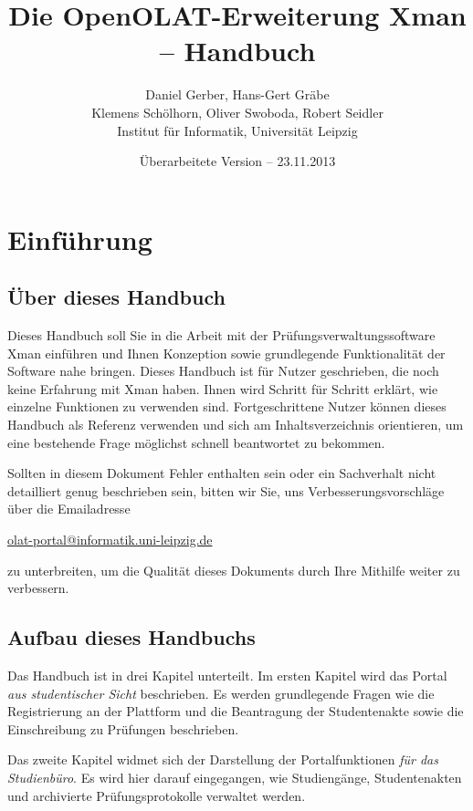 \documentclass[a4paper,11pt]{article}
\author{Daniel Gerber, Hans-Gert Gräbe\\ 
Klemens Schölhorn, Oliver Swoboda, Robert Seidler\\
Institut für Informatik, Universität Leipzig}
\title{Die OpenOLAT-Erweiterung Xman -- Handbuch}
\date{Überarbeitete Version -- 23.11.2013}
\begin{document}
\maketitle

\vspace{3em}

\tableofcontents

\clearpage
\section*{Einführung}

\subsection*{Über dieses Handbuch}

Dieses Handbuch soll Sie in die Arbeit mit der Prüfungsverwaltungssoftware
Xman einführen und Ihnen Konzeption sowie grundlegende Funktionalität der
Software nahe bringen. Dieses Handbuch ist für Nutzer geschrieben, die noch
keine Erfahrung mit Xman haben. Ihnen wird Schritt für Schritt erklärt, wie
einzelne Funktionen zu verwenden sind.  Fortgeschrittene Nutzer können dieses
Handbuch als Referenz verwenden und sich am Inhaltsverzeichnis orientieren, um
eine bestehende Frage möglichst schnell beantwortet zu bekommen.

Sollten in diesem Dokument Fehler enthalten sein oder ein Sachverhalt nicht
detailliert genug beschrieben sein, bitten wir Sie, uns
Verbesserungsvorschläge über die Emailadresse
\begin{center}
  \url{olat-portal@informatik.uni-leipzig.de} 
\end{center}
zu unterbreiten, um die Qualität dieses Dokuments durch Ihre Mithilfe weiter
zu verbessern.

\subsection*{Aufbau dieses Handbuchs}

Das Handbuch ist in drei Kapitel unterteilt. Im ersten Kapitel wird das Portal
{\em aus studentischer Sicht} beschrieben. Es werden
grundlegende Fragen wie die Registrierung an der Plattform und die Beantragung der
Studentenakte sowie die Einschreibung zu Prüfungen beschrieben.

Das zweite Kapitel widmet sich der Darstellung der Portalfunktionen {\em für
das Studienbüro}. Es wird hier darauf eingegangen, wie Studiengänge, Studentenakten
und archivierte Prüfungsprotokolle verwaltet werden.
\end{document}
